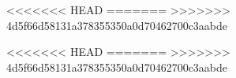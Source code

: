 \documentclass[12pt]{book}
\begin{document}
%    
%    


%         
%         
%         
%         
%         
%         
%         
%         
%         
%         
%         
%         
%         
%         

<<<<<<< HEAD
%         
%         
%         
%         
%         
%         
=======
>>>>>>> 4d5f66d58131a378355350a0d70462700c3aabde


<<<<<<< HEAD
=======
>>>>>>> 4d5f66d58131a378355350a0d70462700c3aabde

\end{document}
